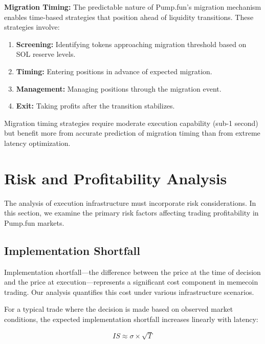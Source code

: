 \documentclass[12pt,a4paper]{article}
\begin{document}
\textbf{Migration Timing:} The predictable nature of Pump.fun's migration mechanism enables time-based strategies that position ahead of liquidity transitions. These strategies involve:

\begin{enumerate}
\item \textbf{Screening:} Identifying tokens approaching migration threshold based on SOL reserve levels.
\item \textbf{Timing:} Entering positions in advance of expected migration.
\item \textbf{Management:} Managing positions through the migration event.
\item \textbf{Exit:} Taking profits after the transition stabilizes.
\end{enumerate}

Migration timing strategies require moderate execution capability (sub-1 second) but benefit more from accurate prediction of migration timing than from extreme latency optimization.

\section{Risk and Profitability Analysis}

The analysis of execution infrastructure must incorporate risk considerations. In this section, we examine the primary risk factors affecting trading profitability in Pump.fun markets.

\subsection{Implementation Shortfall}

Implementation shortfall—the difference between the price at the time of decision and the price at execution—represents a significant cost component in memecoin trading. Our analysis quantifies this cost under various infrastructure scenarios.

For a typical trade where the decision is made based on observed market conditions, the expected implementation shortfall increases linearly with latency:

\begin{equation}
IS \approx \sigma \times \sqrt{T}
\end{equation}
\end{document}
